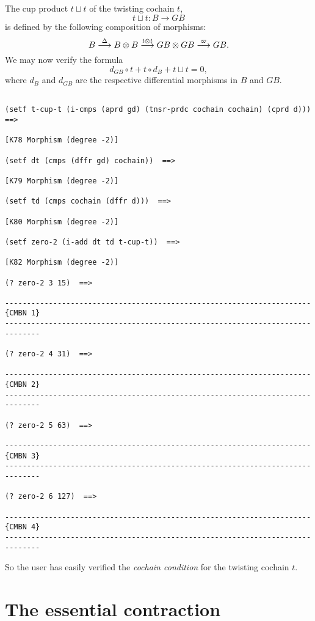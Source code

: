 The cup product $t \sqcup t$ of the twisting cochain $t$,
$$t\sqcup t: B \longrightarrow GB$$
is defined by the following composition of morphisms:
$$B \buildrel {\Delta} \over \longrightarrow B \otimes B
    \buildrel {t \otimes t} \over \longrightarrow GB \otimes GB 
    \buildrel {\varpi} \over \longrightarrow GB.$$
We may now verify the formula
$$ d_{GB} \circ t + t \circ d_B + t\sqcup t =0,$$
where $d_B$ and $d_{GB}$ are  the respective differential morphisms in $B$ and $GB$.
{\footnotesize\begin{verbatim}

(setf t-cup-t (i-cmps (aprd gd) (tnsr-prdc cochain cochain) (cprd d)))  ==>

[K78 Morphism (degree -2)]

(setf dt (cmps (dffr gd) cochain))  ==>

[K79 Morphism (degree -2)]
 
(setf td (cmps cochain (dffr d)))  ==>

[K80 Morphism (degree -2)]

(setf zero-2 (i-add dt td t-cup-t))  ==>

[K82 Morphism (degree -2)]

(? zero-2 3 15)  ==>

----------------------------------------------------------------------{CMBN 1}
------------------------------------------------------------------------------

(? zero-2 4 31)  ==>

----------------------------------------------------------------------{CMBN 2}
------------------------------------------------------------------------------

(? zero-2 5 63)  ==>

----------------------------------------------------------------------{CMBN 3}
------------------------------------------------------------------------------

(? zero-2 6 127)  ==>

----------------------------------------------------------------------{CMBN 4}
------------------------------------------------------------------------------
\end{verbatim}}

So the user has easily verified the {\em cochain condition} for the twisting
cochain $t$.
\newpage

\section {The essential contraction}

